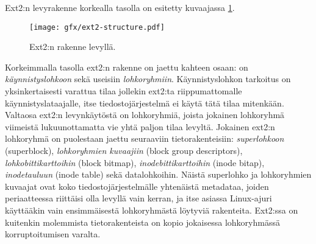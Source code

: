 Ext2:n levyrakenne korkealla tasolla on esitetty kuvaajassa \ref{ext2_disk_format}.

\begin{figure}
    \label{ext2_disk_format}
    \texttt{[image: gfx/ext2-structure.pdf]}
    \caption{Ext2:n rakenne levyllä.}
\end{figure}

Korkeimmalla tasolla ext2:n rakenne on jaettu kahteen osaan: on \emph{käynnistyslohkoon} sekä useisiin \emph{lohkoryhmiin}.
Käynnistyslohkon tarkoitus on yksinkertaisesti varattua tilaa jollekin ext2:ta riippumattomalle käynnistyslataajalle,
itse tiedostojärjestelmä ei käytä tätä tilaa mitenkään.
Valtaosa ext2:n levynkäytöstä on lohkoryhmiä,
joista jokainen lohkoryhmä viimeistä lukuunottamatta vie yhtä paljon tilaa levyltä.
Jokainen ext2:n lohkoryhmä on puolestaan jaettu seuraaviin tietorakenteisiin:
\emph{superlohkoon} (superblock), 
\emph{lohkoryhmien kuvaajiin} (block group descriptors),
\emph{lohkobittikarttoihin} (block bitmap),
\emph{inodebittikarttoihin} (inode bitap),
\emph{inodetauluun} (inode table) sekä datalohkoihin.
Näistä superlohko ja lohkoryhmien kuvaajat ovat koko tiedostojärjestelmälle yhtenäistä metadataa,
joiden periaatteessa riittäisi olla levyllä vain kerran,
ja itse asiassa Linux-ajuri käyttääkin vain ensimmäisestä lohkoryhmästä löytyviä rakenteita.
Ext2:ssa on kuitenkin molemmista tietorakenteista on kopio jokaisessa lohkoryhmässä korruptoitumisen varalta.

